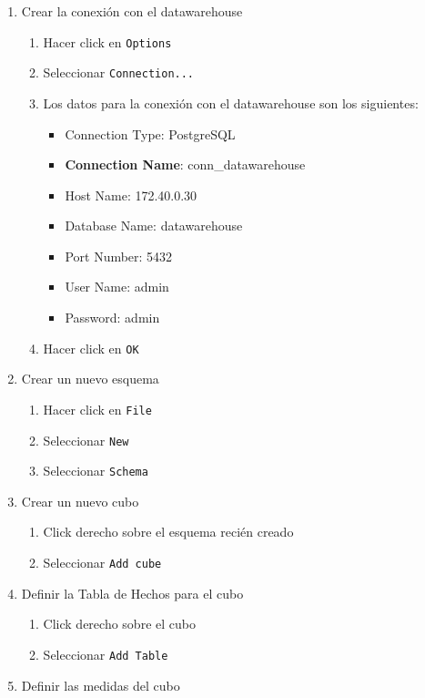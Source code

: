 \begin{enumerate}
    \item Crear la conexión con el datawarehouse
    \begin{enumerate}
        \item Hacer click en \texttt{Options}
        \item Seleccionar \texttt{Connection...}
        \item Los datos para la conexión con el datawarehouse son los siguientes:
        \begin{itemize}
            \item Connection Type: PostgreSQL
            \item \textbf{Connection Name}: conn\_datawarehouse 
            \item Host Name: 172.40.0.30
            \item Database Name: datawarehouse
            \item Port Number: 5432
            \item User Name: admin
            \item Password: admin
        \end{itemize}
        \item Hacer click en \texttt{OK}
    \end{enumerate}
    \item Crear un nuevo esquema
    \begin{enumerate}
        \item Hacer click en \texttt{File}
        \item Seleccionar \texttt{New}
        \item Seleccionar \texttt{Schema}
    \end{enumerate}
    \item Crear un nuevo cubo
    \begin{enumerate}
        \item Click derecho sobre el esquema recién creado
        \item Seleccionar \texttt{Add cube}
    \end{enumerate}
    \item Definir la Tabla de Hechos para el cubo
    \begin{enumerate}
        \item Click derecho sobre el cubo
        \item Seleccionar \texttt{Add Table}
    \end{enumerate}
    \item Definir las medidas del cubo

\end{enumerate}
